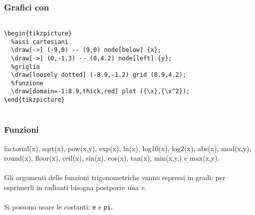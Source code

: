 \begin{frame}\centering
  \frametitle{Grafici con \Tikz}
  \begin{flushleft}
    \texttt{~\\
    \textbackslash{}begin\{tikzpicture\}\\
    ~~\%assi cartesiani\\
    ~~\textbackslash{}draw[-\textgreater{}] (-9,0) -\hspace{0.01mm}- (9,0) node[below] \{\textdollar{}x\textdollar{}\};
\\
    ~~\textbackslash{}draw[-\textgreater{}] (0,-1.3) -\hspace{0.01mm}- (0,4.2) node[left] \{\textdollar{}y\textdollar{}\};\\
    ~~\%griglia\\
    ~~\textbackslash{}draw[loosely dotted] (-8.9,-1.2) grid (8.9,4.2);\\
    ~~\%funzione
\\
    ~~\textbackslash{}draw[domain=-1:8.9,thick,red] plot (\{\textbackslash{}x\},\{\textbackslash{}x\^{}2\});
\\
    \textbackslash{}end\{tikzpicture\}\\~
    }
    \end{flushleft}
\end{frame}
\begin{frame}\centering
  \frametitle{Funzioni}
 factorial(x), sqrt(x), pow(x,y), exp(x), ln(x), log10(x), log2(x), abs(x), mod(x,y), round(x), floor(x), ceil(x), sin(x), cos(x), tan(x), min(x,y,) e max(x,y).\\~\\\pause
 Gli argomenti delle funzioni trigonometriche vanno espressi in gradi; per esprimerli in radianti bisogna postporre una \emph{r}.\\~\\\pause
 Si possono usare le costanti: \texttt{e} e \texttt{pi}.
\end{frame}

